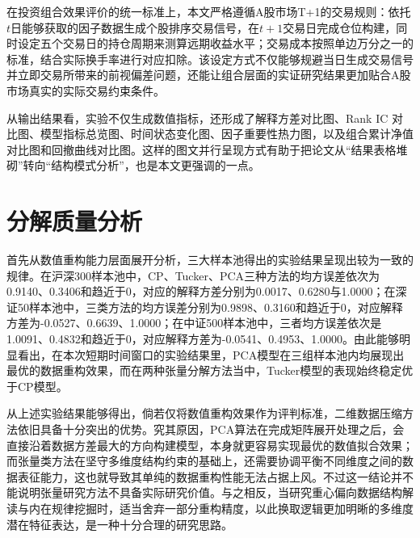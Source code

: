 在投资组合效果评价的统一标准上，本文严格遵循A股市场T+1的交易规则：依托$t$日能够获取的因子数据生成个股排序交易信号，在$t+1$交易日完成仓位构建，同时设定五个交易日的持仓周期来测算远期收益水平；交易成本按照单边万分之一的标准，结合实际换手率进行对应扣除。该设定方式不仅能够规避当日生成交易信号并立即交易所带来的前视偏差问题，还能让组合层面的实证研究结果更加贴合A股市场真实的实际交易约束条件。

从输出结果看，实验不仅生成数值指标，还形成了解释方差对比图、Rank IC 对比图、模型指标总览图、时间状态变化图、因子重要性热力图，以及组合累计净值对比图和回撤曲线对比图。这样的图文并行呈现方式有助于把论文从“结果表格堆砌”转向“结构模式分析”，也是本文更强调的一点。

\section{分解质量分析}

首先从数值重构能力层面展开分析，三大样本池得出的实验结果呈现出较为一致的规律。在沪深300样本池中，CP、Tucker、PCA三种方法的均方误差依次为0.9140、0.3406和趋近于0，对应的解释方差分别为0.0017、0.6280与1.0000；在深证50样本池中，三类方法的均方误差分别为0.9898、0.3160和趋近于0，对应解释方差为-0.0527、0.6639、1.0000；在中证500样本池中，三者均方误差依次是1.0091、0.4832和趋近于0，对应解释方差为-0.0541、0.4953、1.0000。由此能够明显看出，在本次短期时间窗口的实验结果里，PCA模型在三组样本池内均展现出最优的数据重构效果，而在两种张量分解方法当中，Tucker模型的表现始终稳定优于CP模型。

从上述实验结果能够得出，倘若仅将数值重构效果作为评判标准，二维数据压缩方法依旧具备十分突出的优势。究其原因，PCA算法在完成矩阵展开处理之后，会直接沿着数据方差最大的方向构建模型，本身就更容易实现最优的数值拟合效果；而张量类方法在坚守多维度结构约束的基础上，还需要协调平衡不同维度之间的数据表征能力，这也就导致其单纯的数据重构性能无法占据上风。不过这一结论并不能说明张量研究方法不具备实际研究价值。与之相反，当研究重心偏向数据结构解读与内在规律挖掘时，适当舍弃一部分重构精度，以此换取逻辑更加明晰的多维度潜在特征表达，是一种十分合理的研究思路。

